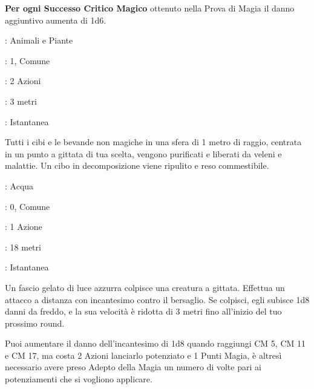 \begin{multicols}{2}
\textbf{Per ogni Successo Critico Magico} ottenuto nella Prova di Magia il danno aggiuntivo aumenta di 1d6.

\noindent\colorbox{OBSSgold!10}{
\begin{minipage}{0.95\linewidth}
\begin{description}[noitemsep, topsep=0pt, parsep=0pt, partopsep=0pt, leftmargin=0cm, labelwidth=1.3cm]
	\item[\textbf{Lista}]: Animali e Piante
	\item[\textbf{Livello}]: 1, Comune
	\item[\textbf{Lancio}]: 2 Azioni
	\item[\textbf{Gittata}]: 3 metri
	\item[\textbf{Durata}]: Istantanea
\end{description}
\end{minipage}}\smallskip

Tutti i cibi e le bevande non magiche in una sfera di 1 metro di raggio, centrata in un punto a gittata di tua scelta, vengono purificati e liberati da veleni e malattie. Un cibo in decomposizione viene ripulito e reso commestibile.

\noindent\colorbox{OBSSgold!10}{
\begin{minipage}{0.95\linewidth}
\begin{description}[noitemsep, topsep=0pt, parsep=0pt, partopsep=0pt, leftmargin=0cm, labelwidth=1.3cm]
	\item[\textbf{Lista}]: Acqua
	\item[\textbf{Livello}]: 0, Comune
	\item[\textbf{Lancio}]: 1 Azione
	\item[\textbf{Gittata}]: 18 metri
	\item[\textbf{Durata}]: Istantanea
\end{description}
\end{minipage}}\smallskip

Un fascio gelato di luce azzurra colpisce una creatura a gittata. Effettua un attacco a distanza con incantesimo contro il bersaglio. Se colpisci, egli subisce 1d8 danni da freddo, e la sua velocità è ridotta di 3 metri fino all'inizio del tuo prossimo round.

Puoi aumentare il danno dell'incantesimo di 1d8 quando raggiungi CM 5, CM 11 e CM 17, ma costa 2 Azioni lanciarlo potenziato e 1 Punti Magia, è altresì necessario avere preso Adepto della Magia un numero di volte pari ai potenziamenti che si vogliono applicare.


\end{multicols}
